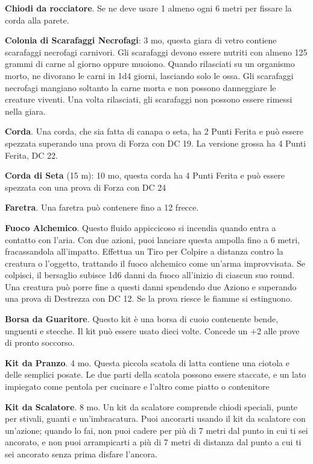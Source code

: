 \documentclass[12pt,a4paper,twoside,openany]{book}
\begin{document}
\begin{multicols}{2}
\textbf{Chiodi da rocciatore}. Se ne deve usare 1 almeno ogni 6 metri per fissare la corda alla parete.

\textbf{Colonia di Scarafaggi Necrofagi}: 3 mo, questa giara di vetro contiene scarafaggi necrofagi carnivori. Gli scarafaggi devono essere nutriti con almeno 125 grammi di carne al giorno oppure muoiono. Quando rilasciati su un organismo morto, ne divorano le carni in 1d4 giorni, lasciando solo le ossa. Gli scarafaggi necrofagi mangiano soltanto la carne morta e non possono danneggiare le creature viventi. Una volta rilasciati, gli scarafaggi non possono essere rimessi nella giara.

\textbf{Corda}. Una corda, che sia fatta di canapa o seta, ha 2 Punti Ferita e può essere spezzata superando una prova di Forza con DC 19. La versione grossa ha 4 Punti Ferita, DC 22.

\textbf{Corda di Seta} (15 m): 10 mo, questa corda ha 4 Punti Ferita e può essere spezzata con una prova di Forza con DC 24

\textbf{Faretra}. Una faretra può contenere fino a 12 frecce.


\textbf{Fuoco Alchemico}. Questo fluido appiccicoso si incendia quando entra a contatto con l’aria. Con due azioni, puoi lanciare questa ampolla fino a 6 metri, fracassandola all’impatto. Effettua un Tiro per Colpire a distanza contro la creatura o l’oggetto, trattando il fuoco alchemico come un’arma improvvisata. Se colpisci, il bersaglio subisce 1d6 danni da fuoco all’inizio di ciascun suo round. Una creatura può porre fine a questi danni spendendo due Aziono e superando una prova di Destrezza con DC 12. Se la prova riesce le fiamme si estinguono.

\textbf{Borsa da Guaritore}. Questo kit è una borsa di cuoio contenente bende, unguenti e stecche. Il kit può essere usato dieci volte. Concede un +2 alle prove di pronto soccorso.

\textbf{Kit da Pranzo}. 4 mo. Questa piccola scatola di latta contiene una ciotola e delle semplici posate. Le due parti della scatola possono essere staccate, e un lato impiegato come pentola per cucinare e l’altro come piatto o contenitore

\textbf{Kit da Scalatore}. 8 mo. Un kit da scalatore comprende chiodi speciali, punte per stivali, guanti e un’imbracatura. Puoi ancorarti usando il kit da scalatore con un’azione; quando lo fai, non puoi cadere per più di 7 metri dal punto in cui ti sei ancorato, e non puoi arrampicarti a più di 7 metri di distanza dal punto a cui ti sei ancorato senza prima disfare l’ancora.


\end{multicols}
\end{document}
